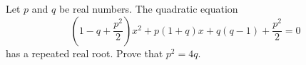 Let $p$ and $q$ be real numbers. The quadratic equation
\[
\left(1-q+\dfrac{p^2}{2}\right)x^2+p(1+q)x+q(q-1)+\dfrac{p^2}{2}=0
\]
has a repeated real root. Prove that $p^2=4q$.
